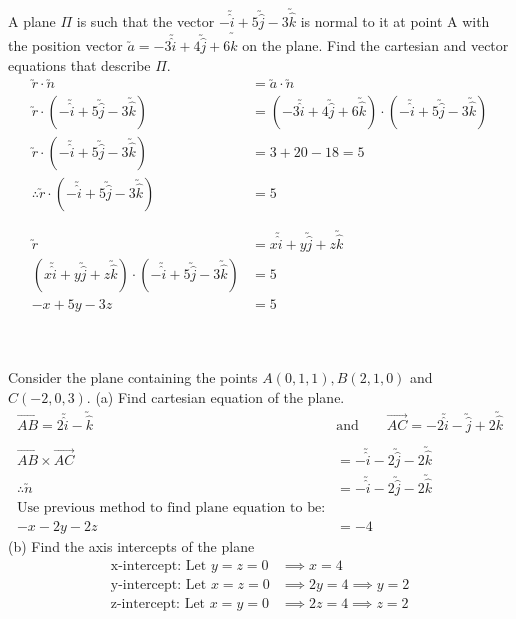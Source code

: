 \documentclass[a4paper,twoside,10pt]{article}
\newenvironment{example}[1]{%
	\mbox{}\\\tcolorbox[beamer,breakable,%
		title=Example: #1,standard jigsaw,opacityback=0, colframe=blue!75!black, boxrule=2pt]}{\endtcolorbox\mbox{}\\}
\begin{document}
			\begin{example}{Equation of a Plane given Point and Normal Vector}
				A plane $\Pi$ is such that the vector $-\utilde{\hat{i}}+5\utilde{\hat{j}}-3\utilde{\hat{k}}$ is normal to it at point A with the position vector $\utilde{a}=-3\utilde{\hat{i}}+4\utilde{\hat{j}}+6\utilde{\hat{k}}$ on the plane. Find the cartesian and vector equations that describe $\Pi$.\\
				\begin{align*}
					\utilde{r}\cdot\utilde{n}&=\utilde{a}\cdot\utilde{n} \\
					\utilde{r}\cdot\left(-\utilde{\hat{i}}+5\utilde{\hat{j}}-3\utilde{\hat{k}}\right)&=\left(-3\utilde{\hat{i}}+4\utilde{\hat{j}}+6\utilde{\hat{k}}\right)\cdot\left(-\utilde{\hat{i}}+5\utilde{\hat{j}}-3\utilde{\hat{k}}\right) \\
					\utilde{r}\cdot\left(-\utilde{\hat{i}}+5\utilde{\hat{j}}-3\utilde{\hat{k}}\right)&=3+20-18=5 \\
					\therefore\utilde{r}\cdot\left(-\utilde{\hat{i}}+5\utilde{\hat{j}}-3\utilde{\hat{k}}\right)&=5\\
					\\
					\\
					\utilde{r}&=x\utilde{\hat{i}}+y\utilde{\hat{j}}+z\utilde{\hat{k}} \\
					\left(x\utilde{\hat{i}}+y\utilde{\hat{j}}+z\utilde{\hat{k}}\right)\cdot\left(-\utilde{\hat{i}}+5\utilde{\hat{j}}-3\utilde{\hat{k}}\right)&=5 \\
					-x+5y-3z&=5
				\end{align*}
			\end{example}
			
			\begin{example}{Equation of Plane Given 3 Points}
				Consider the plane containing the points $A(0,1,1),B(2,1,0)$ and $C(-2,0,3)$.
				(a) Find cartesian equation of the plane.
				\begin{align*}
					\overrightarrow{AB}=2\utilde{\hat{i}}-\utilde{\hat{k}} \qquad &\text{and} \qquad \overrightarrow{AC}=-2\utilde{\hat{i}}-\utilde{\hat{j}}+2\utilde{\hat{k}} \\
					\\
					\overrightarrow{AB}\times\overrightarrow{AC}&=-\utilde{\hat{i}}-2\utilde{\hat{j}}-2\utilde{\hat{k}} \\
					\therefore \utilde{n}&=-\utilde{\hat{i}}-2\utilde{\hat{j}}-2\utilde{\hat{k}} \\
					\text{Use previous method to find plane equation to be:}\\
					-x-2y-2z&=-4
				\end{align*}
				(b) Find the axis intercepts of the plane
				\begin{align*}
					\text{x-intercept: Let }y=z=0&\implies x=4 \\ 
					\text{y-intercept: Let }x=z=0&\implies 2y=4 \implies y=2 \\
					\text{z-intercept: Let }x=y=0&\implies 2z=4 \implies z=2
				\end{align*}
			\end{example}
			
\end{document}
